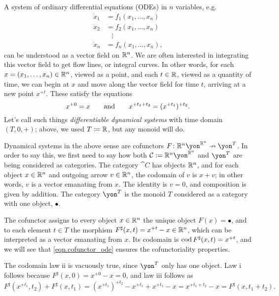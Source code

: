 \documentclass[Book-Poly]{subfiles}
\begin{document}
\begin{example}
A system of ordinary differential equations (ODEs) in $n$ variables, e.g.
\begin{align*}
    \dot{x}_1 &= f_1(x_1, \ldots, x_n) \\
    \dot{x}_2 &= f_2(x_1, \ldots, x_n) \\
    & \; \; \; \vdots \\
    \dot{x}_n &= f_n(x_1, \ldots, x_n),
\end{align*}
can be understood as a vector field on $\mathbb{R}^n$.
We are often interested in integrating this vector field to get flow lines, or integral curves.
In other words, for each $x=(x_1, \ldots, x_n)\in\mathbb{R}^n$, viewed as a point, and each $t\in\mathbb{R}$, viewed as a quantity of time, we can begin at $x$ and move along the vector field for time $t$, arriving at a new point $x^{+t}$. These satisfy the equations
\begin{equation} \label{eqn.cofunctor_ode}
    x^{+0} = x \qquad\text{and}\qquad x^{+t_1+t_2} = (x^{+t_1})^{+t_2}. 
\end{equation}
Let's call such things \emph{differentiable dynamical systems} with time domain $(T, 0, +)$; above, we used $T\coloneqq\mathbb{R}$, but any monoid will do.

Dynamical systems in the above sense are cofunctors $F \colon \rr^n \yon^{\rr^n} \cof \yon^T$.
In order to say this, we first need to say how both $\cat{C} := \rr^n \yon^{\rr^n}$ and $\yon^T$ are being considered as categories.
The category $\cat{C}$ has objects $\mathbb{R}^n$, and for each object $x \in \mathbb{R}^n$ and outgoing arrow $v \in \mathbb{R}^n$, the codomain of $v$ is $x + v$; in other words, $v$ is a vector emanating from $x$.
The identity is $v = 0$, and composition is given by addition.
The category $\yon^T$ is the monoid $T$ considered as a category with one object, $\bullet$.

The cofunctor assigns to every object $x \in \mathbb{R}^n$ the unique object $F(x) = \bullet$, and to each element $t \in T$ the morphism $F^\sharp(x, t) = x^{+t} - x \in \mathbb{R}^n$, which can be interpreted as a vector emanating from $x$.
Its codomain is $\operatorname{cod} F^\sharp(x, t) = x^{+t}$, and we will see that \eqref{eqn.cofunctor_ode} ensures the cofunctoriality properties.

The codomain law ii is vacuously true, since $\yon^T$ only has one object.
Law i follows because $F^\sharp(x, 0) = x^{+0} - x = 0$, and law iii follows as
\[
    F^\sharp(x^{+t_1}, t_2) + F^\sharp(x, t_1) = (x^{+t_1})^{+t_2} - x^{+t_1} + x^{+t_1} - x = x^{+t_1 + t_2} - x = F^\sharp(x, t_1+t_2).
\]
\end{example}
\end{document}
